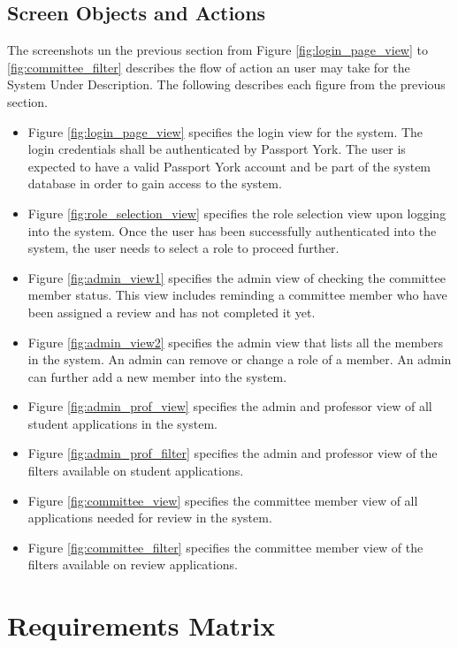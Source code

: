 \documentclass[fontsize=12pt,paper=letter,twoside]{scrartcl}
\begin{document}
\clearpage
\newpage
\subsection{Screen Objects and Actions}

The screenshots un the previous section from Figure \ref{fig:login_page_view} to \ref{fig:committee_filter} describes the flow of action an user may take for the System Under Description. The following describes each figure from the previous section.

\begin{itemize}
\item Figure \ref{fig:login_page_view} specifies the login view for the system. The login credentials shall be authenticated by Passport York. The user is expected to have a valid Passport York account and be part of the system database in order to gain access to the system.
\item Figure \ref{fig:role_selection_view} specifies the role selection view upon logging into the system. Once the user has been successfully authenticated into the system, the user needs to select a role to proceed further.
\item Figure \ref{fig:admin_view1} specifies the admin view of checking the committee member status. This view includes reminding a committee member who have been assigned a review and has not completed it yet.
\item Figure \ref{fig:admin_view2} specifies the admin view that lists all the members in the system. An admin can remove or change a role of a member. An admin can further add a new member into the system.
\item Figure \ref{fig:admin_prof_view} specifies the admin and professor view of all student applications in the system.
\item Figure \ref{fig:admin_prof_filter} specifies the admin and professor view of the filters available on student applications.
\item Figure \ref{fig:committee_view} specifies the committee member view of all applications needed for review in the system.
\item Figure \ref{fig:committee_filter} specifies the committee member view of the filters available on review applications.
\end{itemize}


\newpage
\section{Requirements Matrix}
\end{document}
